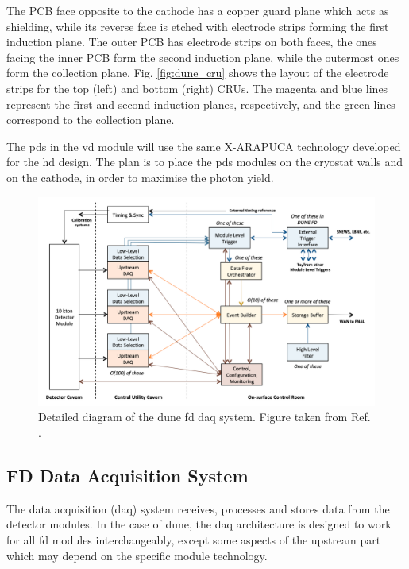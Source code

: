 The PCB face opposite to the cathode has a copper guard plane which acts as shielding, while its reverse face is etched with electrode strips forming the first induction plane. The outer PCB has electrode strips on both faces, the ones facing the inner PCB form the second induction plane, while the outermost ones form the collection plane. Fig. \ref{fig:dune_cru} shows the layout of the electrode strips for the top (left) and bottom (right) CRUs. The magenta and blue lines represent the first and second induction planes, respectively, and the green lines correspond to the collection plane.

The \gls{pds} in the \gls{vd} module will use the same X-ARAPUCA technology developed for the \gls{hd} design. The plan is to place the \gls{pds} modules on the cryostat walls and on the cathode, in order to maximise the photon yield.


\begin{figure}[t]
	\centering
	\includegraphics[width=0.8\linewidth]{Images/DUNE/FD/DAQ_detailed2}
	\caption[Detailed diagram of the \gls{dune} \gls{fd} \gls{daq} system.]{Detailed diagram of the \gls{dune} \gls{fd} \gls{daq} system. Figure taken from Ref. \cite{DUNE2020TDR4}.}
	\label{fig:daq1}
\end{figure}

\subsection{FD Data Acquisition System}

The data acquisition (\gls{daq}) system receives, processes and stores data from the detector modules. In the case of \gls{dune}, the \gls{daq} architecture is designed to work for all \gls{fd} modules interchangeably, except some aspects of the upstream part which may depend on the specific module technology.

